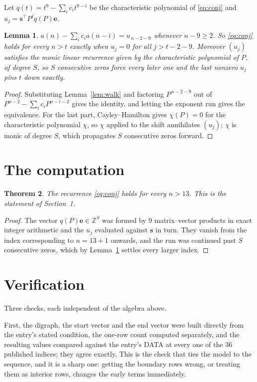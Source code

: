 \documentclass[11pt,a4paper]{article}
\theoremstyle{plain}
\newtheorem{theorem}{Theorem}
\newtheorem{lemma}[theorem]{Lemma}
\theoremstyle{definition}
\begin{document}
Let $q(t)=t^{9}-\sum_i c_i t^{9-i}$ be the characteristic polynomial of
\eqref{eq:conj} and $u_j=\mathbf{s}^{\!\top}P^{j}q(P)\mathbf{e}$.

\begin{lemma}\label{lem:crit}
$a(n)-\sum_i c_i a(n-i)=u_{\,n-2-9}$ whenever $n-9\ge2$. So \eqref{eq:conj}
holds for every $n>t$ exactly when $u_j=0$ for all $j>t-2-9$. Moreover $(u_j)$
satisfies the monic linear recurrence given by the characteristic polynomial of $P$, of
degree $S$, so $S$ consecutive zeros force every later one and the last nonzero $u_j$ pins
$t$ down exactly.
\end{lemma}

\begin{proof}
Substituting Lemma~\ref{lem:walk} and factoring $P^{\,n-2-9}$ out of
$P^{n-2}-\sum_i c_i P^{n-i-2}$ gives the identity, and letting the exponent run gives the
equivalence. For the last part, Cayley--Hamilton gives $\chi(P)=0$ for the characteristic
polynomial $\chi$, so $\chi$ applied to the shift annihilates $(u_j)$; $\chi$ is monic of
degree $S$, which propagates $S$ consecutive zeros forward.
\end{proof}

\section{The computation}

\begin{theorem}
The recurrence \eqref{eq:conj} holds for every $n>13$. This is the statement of
Section~1.
\end{theorem}

\begin{proof}
The vector $q(P)\mathbf{e}\in\mathbb{Z}^{S}$ was formed by $9$ matrix--vector
products in exact integer arithmetic and the $u_j$ evaluated against $\mathbf{s}$ in turn.
They vanish from the index corresponding to $n=13+1$ onwards, and the run was continued
past $S$ consecutive zeros, which by Lemma~\ref{lem:crit} settles every larger index.
\end{proof}

\section{Verification}

Three checks, each independent of the algebra above.

First, the digraph, the start vector and the end vector were built directly from the
entry's stated condition, the one-row count computed separately, and the resulting values
compared against the entry's DATA at every one of the $36$ published indices; they
agree exactly. This is the check that ties the model to the sequence, and it is a sharp one:
getting the boundary rows wrong, or treating them as interior rows, changes the early terms
immediately.
\end{document}
